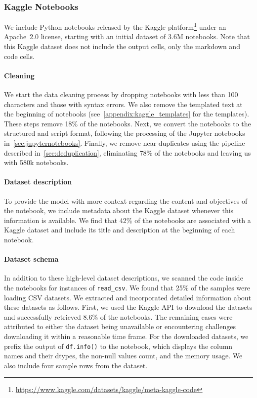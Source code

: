\documentclass[10pt]{article} %
\begin{document}
\subsubsection{Kaggle Notebooks}
We include Python notebooks released by the Kaggle platform\footnote{\url{https://www.kaggle.com/datasets/kaggle/meta-kaggle-code}} under an Apache~2.0 license, starting with an initial dataset of 3.6M notebooks. Note that this Kaggle dataset does not include the output cells, only the markdown and code cells.  

\paragraph{Cleaning} We start the data cleaning process by dropping notebooks with less than 100 characters and those with syntax errors. We also remove the templated text at the beginning of notebooks (see~\cref{appendix:kaggle_templates} for the templates). These steps remove 18\% of the notebooks. Next, we convert the notebooks to the structured and script format, following the processing of the Jupyter notebooks in~\cref{sec:jupyternotebooks}. Finally, we remove near-duplicates using the pipeline described in~\cref{sec:deduplication}, eliminating 78\% of the notebooks and leaving us with 580k notebooks.


\paragraph{Dataset description} To provide the model with more context regarding the content and objectives of the notebook, we include metadata about the Kaggle dataset whenever this information is available. We find that 42\% of the notebooks are associated with a Kaggle dataset and include its title and description at the beginning of each notebook. 

\paragraph{Dataset schema} In addition to these high-level dataset descriptions, we scanned the code inside the notebooks for instances of \texttt{read\_csv}. We found that 25\% of the samples were loading CSV datasets. We extracted and incorporated detailed information about these datasets as follows. First, we used the Kaggle API to download the datasets and successfully retrieved 8.6\% of the notebooks. The remaining cases were attributed to either the dataset being unavailable or encountering challenges downloading it within a reasonable time frame. For the downloaded datasets, we prefix the output of \texttt{df.info()} to the notebook, which displays the column names and their dtypes, the non-null values count, and the memory usage. We also include four sample rows from the dataset. 
\end{document}
